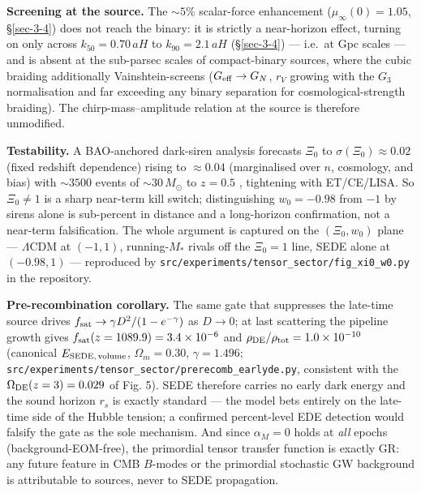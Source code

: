 \documentclass[preprint,12pt]{elsarticle}
\begin{document}
\textbf{Screening at the source.} The \(\sim\!5\%\) scalar-force
enhancement (\(\mu_\infty(0) = 1.05\), §\ref{sec-3-4}) does not reach
the binary: it is strictly a near-horizon effect, turning on only across
\(k_{50} = 0.70\,aH\) to \(k_{90} = 2.1\,aH\) (§\ref{sec-3-4}) ---
i.e.~at Gpc scales --- and is absent at the sub-parsec scales of
compact-binary sources, where the cubic braiding additionally
Vainshtein-screens (\(G_{\rm eff}\to G_N\), \(r_V\) growing with the
\(G_3\) normalisation and far exceeding any binary separation for
cosmological-strength braiding). The chirp-mass--amplitude relation at
the source is therefore unmodified.

\textbf{Testability.} A BAO-anchored dark-siren analysis forecasts
\(\Xi_0\) to \(\sigma(\Xi_0) \approx 0.02\) (fixed redshift dependence)
rising to \(\approx 0.04\) (marginalised over \(n\), cosmology, and
bias) with \(\sim\!3500\) events of \(\sim\!30\,M_\odot\) to \(z = 0.5\)
\citep{Mukherjee:2021siren}, tightening with ET/CE/LISA. So
\(\Xi_0 \neq 1\) is a sharp near-term kill switch; distinguishing
\(w_0 = -0.98\) from \(-1\) by sirens alone is sub-percent in distance
and a long-horizon confirmation, not a near-term falsification. The
whole argument is captured on the \((\Xi_0, w_0)\) plane ---
\(\Lambda\)CDM at \((-1,1)\), running-\(M_*\) rivals off the
\(\Xi_0 = 1\) line, SEDE alone at \((-0.98,1)\) --- reproduced by
\texttt{src/\allowbreak experiments/\allowbreak tensor\_\allowbreak sector/\allowbreak fig\_\allowbreak xi0\_\allowbreak w0.\allowbreak py} in the
repository.

\textbf{Pre-recombination corollary.} The same gate that suppresses the
late-time source drives \(f_{\rm sat} \to \gamma D^2/(1 - e^{-\gamma})\)
as \(D \to 0\); at last scattering the pipeline growth gives
\(f_{\rm sat}(z = 1089.9) = 3.4\times10^{-6}\) and
\(\rho_{\rm DE}/\rho_{\rm tot} = 1.0\times10^{-10}\) (canonical
\(E_{\rm SEDE,\,volume}\), \(\Omega_m = 0.30\), \(\gamma = 1.496\);
\texttt{src/\allowbreak experiments/\allowbreak tensor\_\allowbreak sector/\allowbreak prerecomb\_\allowbreak earlyde.\allowbreak py},
consistent with the \(\Omega_{\rm DE}(z=3) = 0.029\) of Fig. 5). SEDE
therefore carries no early dark energy and the sound horizon \(r_s\) is
exactly standard --- the model bets entirely on the late-time side of
the Hubble tension; a confirmed percent-level EDE detection would
falsify the gate as the sole mechanism. And since \(\alpha_M = 0\) holds
at \emph{all} epochs (background-EOM-free), the primordial tensor
transfer function is exactly GR: any future feature in CMB \(B\)-modes
or the primordial stochastic GW background is attributable to sources,
never to SEDE propagation.
\end{document}
